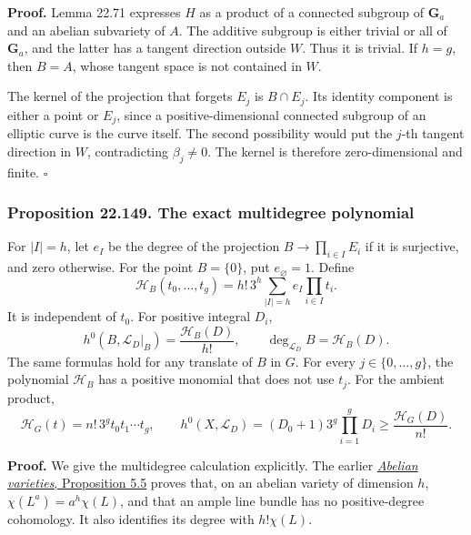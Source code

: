 \documentclass[
  11pt,
  a4paper,
]{article}
\begin{document}
\textbf{Proof.} Lemma 22.71 expresses \(H\) as a product of a connected
subgroup of \(\mathbf G_a\) and an abelian subvariety of \(A\). The
additive subgroup is either trivial or all of \(\mathbf G_a\), and the
latter has a tangent direction outside \(W\). Thus it is trivial. If
\(h=g\), then \(B=A\), whose tangent space is not contained in \(W\).

The kernel of the projection that forgets \(E_j\) is \(B\cap E_j\). Its
identity component is either a point or \(E_j\), since a
positive-dimensional connected subgroup of an elliptic curve is the
curve itself. The second possibility would put the \(j\)-th tangent
direction in \(W\), contradicting \(\beta_j\ne0\). The kernel is
therefore zero-dimensional and finite. \(\square\)

\subsubsection{Proposition 22.149. The exact multidegree
polynomial}\label{proposition-22.149.-the-exact-multidegree-polynomial}

For \(|I|=h\), let \(e_I\) be the degree of the projection
\(B\to\prod_{i\in I}E_i\) if it is surjective, and zero otherwise. For
the point \(B=\{0\}\), put \(e_\varnothing=1\). Define \[
 \mathcal H_B(t_0,\ldots,t_g)
   =h!\,3^h\sum_{|I|=h}e_I\prod_{i\in I}t_i.
 \tag{22.400}
\] It is independent of \(t_0\). For positive integral \(D_i\), \[
 h^0(B,\mathcal L_D|_B)=\frac{\mathcal H_B(D)}{h!},
 \qquad
 \deg_{\mathcal L_D}B=\mathcal H_B(D).
 \tag{22.401}
\] The same formulas hold for any translate of \(B\) in \(G\). For every
\(j\in\{0,\ldots,g\}\), the polynomial \(\mathcal H_B\) has a positive
monomial that does not use \(t_j\). For the ambient product, \[
 \mathcal H_G(t)=n!\,3^g t_0t_1\cdots t_g,\qquad
 h^0(X,\mathcal L_D)=(D_0+1)3^g\prod_{i=1}^gD_i
                  \ge\frac{\mathcal H_G(D)}{n!}.
 \tag{22.402}
\]

\textbf{Proof.} We give the multidegree calculation explicitly. The
earlier
\href{https://github.com/KokunoYumeto/open-math-courses-public/blob/146dc81802e69cf262fb6cc65c1b9f74e71f4625/docs/courses/AG-GS/src/abelian-varieties.md\#5-multiplication-pulls-back-quadratically}{\emph{Abelian
varieties}, Proposition 5.5} proves that, on an abelian variety of
dimension \(h\), \(\chi(L^a)=a^h\chi(L)\), and that an ample line bundle
has no positive-degree cohomology. It also identifies its degree with
\(h!\chi(L)\).
\end{document}
